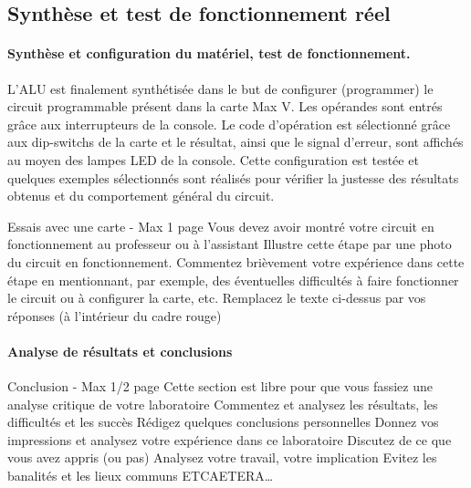 \documentclass[a4paper]{article}
\begin{document}
\subsection{Synthèse et test de fonctionnement réel}
\paragraph{Synthèse et configuration du matériel, test de fonctionnement.}
L’ALU est finalement synthétisée dans le but de configurer (programmer) le circuit programmable présent dans la carte Max V. Les opérandes sont entrés grâce aux interrupteurs de la console. Le code d’opération est sélectionné grâce aux dip-switchs de la carte et le résultat, ainsi que le signal d’erreur, sont affichés au moyen des lampes LED de la console. Cette configuration est testée et quelques exemples sélectionnés sont réalisés pour vérifier la justesse des résultats obtenus et du comportement général du circuit.

\begin{tcolorbox}[colframe=Monokaimagenta,colback=white]
Essais avec une carte - Max 1 page 
Vous devez avoir montré votre circuit en fonctionnement au professeur ou à l’assistant
Illustre cette étape par une photo du circuit en fonctionnement.
Commentez brièvement votre expérience dans cette étape en mentionnant, par exemple, des éventuelles difficultés à faire fonctionner le circuit ou à configurer la carte, etc.
Remplacez le texte ci-dessus par vos réponses (à l’intérieur du cadre rouge)
\end{tcolorbox}

\paragraph{Analyse de résultats et conclusions}
\begin{tcolorbox}[colframe=Monokaimagenta,colback=white]
Conclusion - Max 1/2 page 
Cette section est libre pour que vous fassiez une analyse critique de votre laboratoire
Commentez et analysez 
les résultats, 
les difficultés et les succès
Rédigez quelques conclusions personnelles
Donnez vos impressions et analysez votre expérience dans ce laboratoire
Discutez de ce que vous avez appris (ou pas)
Analysez votre travail, votre implication
Evitez les banalités et les lieux communs
ETCAETERA…
\end{tcolorbox}
\end{document}
